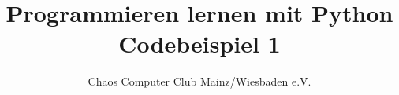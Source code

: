 



	\title{Programmieren lernen mit Python\\Codebeispiel 1}
	\author{Chaos Computer Club Mainz/Wiesbaden e.V.}
	\maketitle
	
	\section*{}
	
	\lstset{numbers=left}
	
	
